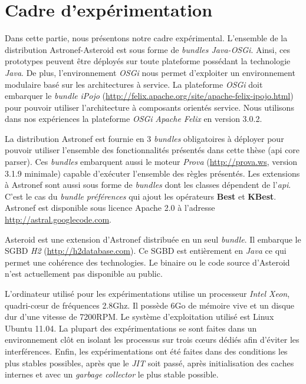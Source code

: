 \section{Cadre d'expérimentation}\label{sec:valid:perfs:cadre}
Dans cette partie, nous présentons notre cadre expérimental. L'ensemble de la distribution Astronef-Asteroid est sous forme de \textit{bundles Java-OSGi}. Ainsi, ces prototypes peuvent être déployés sur toute plateforme possédant la technologie \textit{Java}. De plus, l'environnement \textit{OSGi} nous permet d'exploiter un environnement modulaire basé sur les architectures à service. La plateforme \textit{OSGi} doit embarquer le \textit{bundle} \textit{iPojo} (\url{http://felix.apache.org/site/apache-felix-ipojo.html}) pour pouvoir utiliser l'architecture à composants orientés service. Nous utilisons dans nos expériences la plateforme \textit{OSGi} \textit{Apache Felix} en version 3.0.2.

La distribution Astronef est fournie en 3 \textit{bundles} obligatoires à déployer pour pouvoir utiliser l'ensemble des fonctionnalités présentés dans cette thèse (api core parser). Ces \textit{bundles} embarquent aussi le moteur \textit{Prova} (\url{http://prova.ws}, version 3.1.9 minimale) capable d'exécuter l'ensemble des règles présentés. Les extensions à Astronef sont aussi sous forme de \textit{bundles} dont les classes dépendent de l'\textit{api}. C'est le cas du \textit{bundle} \textit{préférences} qui ajout les opérateurs \textbf{Best} et \textbf{KBest}. Astronef est disponible sous licence Apache 2.0 à l'adresse \url{http://astral.googlecode.com}.

Asteroid est une extension d'Astronef distribuée en un seul \textit{bundle}. Il embarque le SGBD \textit{H2} (\url{http://h2database.com}). Ce SGBD est entièrement en \textit{Java} ce qui permet une cohérence des technologies. Le binaire ou le code source d'Asteroid n'est actuellement pas disponible au public.

L'ordinateur utilisé pour les expérimentations utilise un processeur \textit{Intel Xeon}, quadri-cœur de fréquences 2.8Ghz. Il possède 6Go de mémoire vive et un disque dur d'une vitesse de 7200RPM. Le système d'exploitation utilisé est Linux Ubuntu 11.04. La plupart des expérimentations se sont faites dans un environnement clôt en isolant les processus sur trois cœurs dédiés afin d'éviter les interférences. Enfin, les expérimentations ont été faites dans des conditions les plus stables possibles, après que le \textit{JIT} soit passé, après initialisation des caches internes et avec un \textit{garbage collector} le plus stable possible.

